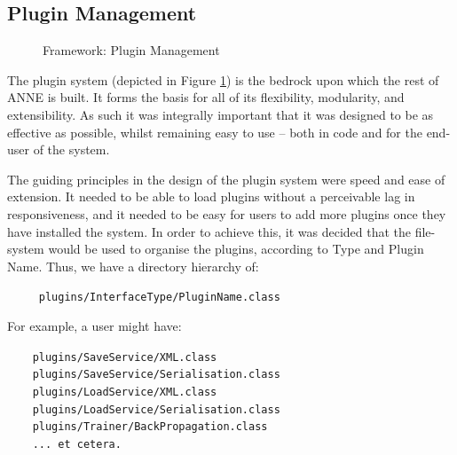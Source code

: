 \documentclass{acm_proc_article-sp}
\begin{document}
\subsection{Plugin Management}
{
\begin{figure}[t]
\centering
{}
\caption{Framework: Plugin Management}
\label{fig:framework:plugins}
\end{figure}
The plugin system (depicted in Figure \ref{fig:framework:plugins}) is the bedrock upon which the rest of ANNE is built. It forms the basis for all of its flexibility, modularity, and extensibility. As such it was integrally important that it was designed to be as effective as possible, whilst remaining easy to use {--} both in code and for the end{}-user of the system.

The guiding principles in the design of the plugin system were speed and ease of extension. It needed to be able to load plugins without a perceivable lag in responsiveness, and it needed to be easy for users to add more plugins once they have installed the system. In order to achieve this, it was decided that the file{}-system would be used to organise the plugins, according to Type and Plugin Name. Thus, we have a directory hierarchy of:

\texttt{
~~~ plugins/InterfaceType/PluginName.class
}

For example, a user might have:

\indent\texttt{~~~ plugins/SaveService/XML.class} \\
\indent\texttt{~~~ plugins/SaveService/Serialisation.class} \\
\indent\texttt{~~~ plugins/LoadService/XML.class} \\
\indent\texttt{~~~ plugins/LoadService/Serialisation.class} \\
\indent\texttt{~~~ plugins/Trainer/BackPropagation.class} \\
\indent\texttt{~~~ ... et cetera.}

}
\end{document}
